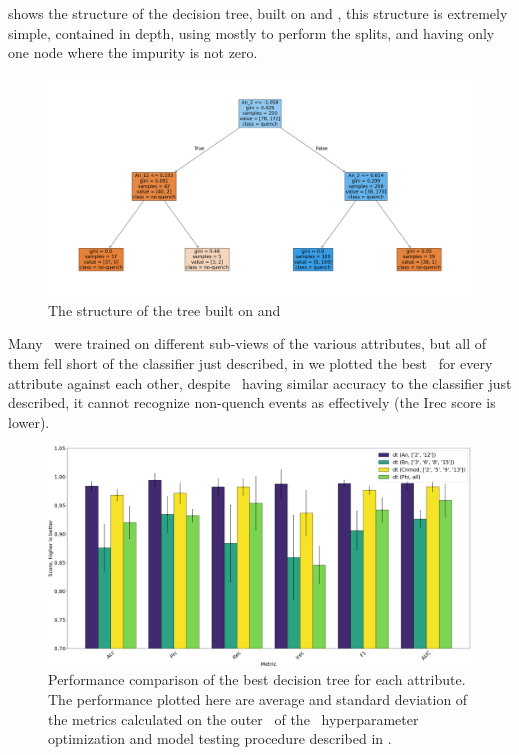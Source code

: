  shows the structure of the decision tree, built on \an[2] and \an[12], this
structure is extremely simple, contained in depth, using mostly \an[2] to perform the splits, and
having only one node where the impurity is not zero.
\begin{figure}[!ht]
	\centering
	\includegraphics[width=\linewidth]{img/An_2_12_pt_dt.png}
	\caption{The structure of the tree built on \an[2] and \an[12]} \label{fig:dt-an-2-12-pt}
\end{figure}
Many \dts\ were trained on different sub-views of the various attributes, but all of them fell short
of the classifier just described, in  we plotted the best \dt\ for every
attribute against each other, despite \cnmod\ having similar accuracy to the classifier just
described, it cannot recognize non-quench events as effectively (the Irec score is lower).
\begin{figure}[!ht]
	\centering
	\includegraphics[width=\linewidth]{img/best_dts.png}
	\caption{Performance comparison of the best decision tree for each attribute. The
		performance plotted here are average and standard deviation of the metrics calculated on the
		outer \cv\ of the \ncv\ hyperparameter optimization and model testing procedure described in
		.} \label{fig:best-dts}
\end{figure}

